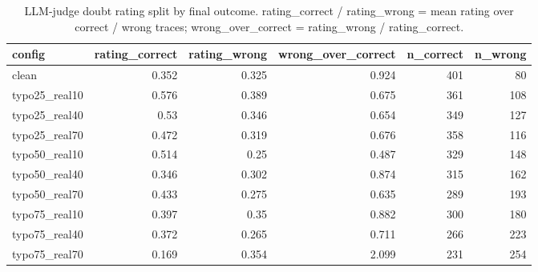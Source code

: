 \documentclass[11pt]{article}
\begin{document}
\begin{table}[H]
\centering
\caption{LLM-judge doubt rating split by final outcome. rating\_correct / rating\_wrong = mean rating over correct / wrong traces; wrong\_over\_correct = rating\_wrong / rating\_correct.}
\small
\begin{adjustbox}{max width=\textwidth}
\begin{tabular}{lrrrrr}
\toprule
\textbf{config} & \textbf{rating\_correct} & \textbf{rating\_wrong} & \textbf{wrong\_over\_correct} & \textbf{n\_correct} & \textbf{n\_wrong} \\
\midrule
clean & 0.352 & 0.325 & 0.924 & 401 & 80 \\
typo25\_real10 & 0.576 & 0.389 & 0.675 & 361 & 108 \\
typo25\_real40 & 0.53 & 0.346 & 0.654 & 349 & 127 \\
typo25\_real70 & 0.472 & 0.319 & 0.676 & 358 & 116 \\
typo50\_real10 & 0.514 & 0.25 & 0.487 & 329 & 148 \\
typo50\_real40 & 0.346 & 0.302 & 0.874 & 315 & 162 \\
typo50\_real70 & 0.433 & 0.275 & 0.635 & 289 & 193 \\
typo75\_real10 & 0.397 & 0.35 & 0.882 & 300 & 180 \\
typo75\_real40 & 0.372 & 0.265 & 0.711 & 266 & 223 \\
typo75\_real70 & 0.169 & 0.354 & 2.099 & 231 & 254 \\
\bottomrule
\end{tabular}
\end{adjustbox}
\end{table}
\end{document}
